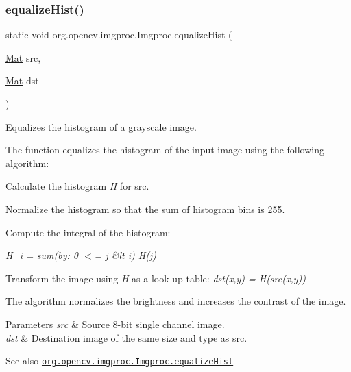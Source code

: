 \subsubsection{\texorpdfstring{equalize\+Hist()}{equalizeHist()}}
{\footnotesize\ttfamily static void org.\+opencv.\+imgproc.\+Imgproc.\+equalize\+Hist (\begin{DoxyParamCaption}\item[{\mbox{\hyperlink{classorg_1_1opencv_1_1core_1_1_mat}{Mat}}}]{src,  }\item[{\mbox{\hyperlink{classorg_1_1opencv_1_1core_1_1_mat}{Mat}}}]{dst }\end{DoxyParamCaption})\hspace{0.3cm}{\ttfamily [static]}}

Equalizes the histogram of a grayscale image.

The function equalizes the histogram of the input image using the following algorithm\+:


\begin{DoxyItemize}
\item Calculate the histogram {\itshape H} for {\ttfamily src}. 
\item Normalize the histogram so that the sum of histogram bins is 255. 
\item Compute the integral of the histogram\+: 
\end{DoxyItemize}

{\itshape H\textquotesingle{}\+\_\+i = sum(by\+: 0 $<$= j \&lt i) H(j)}


\begin{DoxyItemize}
\item 
\end{DoxyItemize}

Transform the image using {\itshape H\textquotesingle{}} as a look-\/up table\+: {\itshape dst(x,y) = H\textquotesingle{}(src(x,y))}

The algorithm normalizes the brightness and increases the contrast of the image.


\begin{DoxyParams}{Parameters}
{\em src} & Source 8-\/bit single channel image. \\
\hline
{\em dst} & Destination image of the same size and type as {\ttfamily src}.\\
\hline
\end{DoxyParams}
\begin{DoxySeeAlso}{See also}
\href{http://docs.opencv.org/modules/imgproc/doc/histograms.html#equalizehist}{\tt org.\+opencv.\+imgproc.\+Imgproc.\+equalize\+Hist} 
\end{DoxySeeAlso}
\mbox{\label{classorg_1_1opencv_1_1imgproc_1_1_imgproc_addf44b4eae2f6a52e93c1018cdb07ddc}} 
